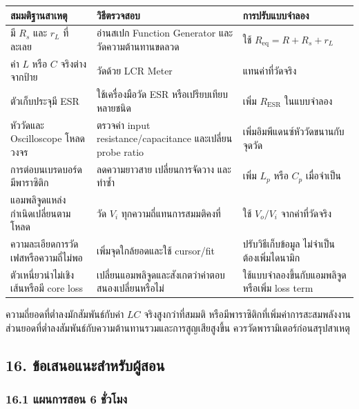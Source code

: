 \begin{table}[htbp]
    \centering
    \begin{tabular}{l l l}
        \hline
        \textbf{สมมติฐานสาเหตุ} & \textbf{วิธีตรวจสอบ} & \textbf{การปรับแบบจำลอง} \\
        \hline
        มี $R_s$ และ $r_L$ ที่ละเลย & อ่านสเปก Function Generator และวัดความต้านทานขดลวด & ใช้ $R_{\text{eq}}=R+R_s+r_L$ \\
        ค่า $L$ หรือ $C$ จริงต่างจากป้าย & วัดด้วย LCR Meter & แทนค่าที่วัดจริง \\
        ตัวเก็บประจุมี ESR & ใช้เครื่องมือวัด ESR หรือเปรียบเทียบหลายชนิด & เพิ่ม $R_{\text{ESR}}$ ในแบบจำลอง \\
        หัววัดและ Oscilloscope โหลดวงจร & ตรวจค่า input resistance/capacitance และเปลี่ยน probe ratio & เพิ่มอิมพีแดนซ์หัววัดขนานกับจุดวัด \\
        การต่อบนเบรดบอร์ดมีพาราซิติก & ลดความยาวสาย เปลี่ยนการจัดวาง และทำซ้ำ & เพิ่ม $L_p$ หรือ $C_p$ เมื่อจำเป็น \\
        แอมพลิจูดแหล่งกำเนิดเปลี่ยนตามโหลด & วัด $V_i$ ทุกความถี่แทนการสมมติคงที่ & ใช้ $V_o/V_i$ จากค่าที่วัดจริง \\
        ความละเอียดการวัดเฟสหรือความถี่ไม่พอ & เพิ่มจุดใกล้ยอดและใช้ cursor/fit & ปรับวิธีเก็บข้อมูล ไม่จำเป็นต้องเพิ่มไดนามิก \\
        ตัวเหนี่ยวนำไม่เชิงเส้นหรือมี core loss & เปลี่ยนแอมพลิจูดและสังเกตว่าค่าตอบสนองเปลี่ยนหรือไม่ & ใช้แบบจำลองขึ้นกับแอมพลิจูดหรือเพิ่ม loss term \\
        \hline
    \end{tabular}
\end{table}

ความถี่ยอดที่ต่ำลงมักสัมพันธ์กับค่า $LC$ จริงสูงกว่าที่สมมติ หรือมีพาราซิติกที่เพิ่มค่าการสะสมพลังงาน ส่วนยอดที่ต่ำลงสัมพันธ์กับความต้านทานรวมและการสูญเสียสูงขึ้น ควรวัดพารามิเตอร์ก่อนสรุปสาเหตุ


\subsection{16. ข้อเสนอแนะสำหรับผู้สอน}

\subsubsection{16.1 แผนการสอน 6 ชั่วโมง}

